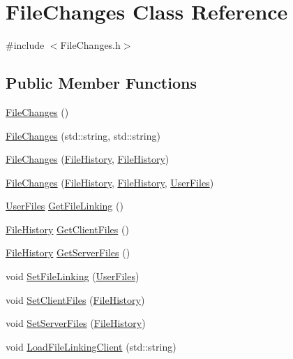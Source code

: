 \hypertarget{classFileChanges}{\section{File\-Changes Class Reference}
\label{classFileChanges}
}


{\ttfamily \#include $<$File\-Changes.\-h$>$}

\subsection*{Public Member Functions}
\begin{DoxyCompactItemize}
\item 
\hyperlink{classFileChanges_a08f26a2d98f89ead61b9ac168148c878}{File\-Changes} ()
\item 
\hyperlink{classFileChanges_aaca377114982dfcfa2b518baec9f5784}{File\-Changes} (std\-::string, std\-::string)
\item 
\hyperlink{classFileChanges_abdfc0f79e90aa8ad37267f98104d0933}{File\-Changes} (\hyperlink{classFileHistory}{File\-History}, \hyperlink{classFileHistory}{File\-History})
\item 
\hyperlink{classFileChanges_add57e12ef22e156189a30afd8e06eec9}{File\-Changes} (\hyperlink{classFileHistory}{File\-History}, \hyperlink{classFileHistory}{File\-History}, \hyperlink{classUserFiles}{User\-Files})
\item 
\hyperlink{classUserFiles}{User\-Files} \hyperlink{classFileChanges_a227a56abb0a1af33d58833f697ee0741}{Get\-File\-Linking} ()
\item 
\hyperlink{classFileHistory}{File\-History} \hyperlink{classFileChanges_a05a284928ea81e68f804a12138318248}{Get\-Client\-Files} ()
\item 
\hyperlink{classFileHistory}{File\-History} \hyperlink{classFileChanges_a70980beabde9fc4caf69db9be0bffdd0}{Get\-Server\-Files} ()
\item 
void \hyperlink{classFileChanges_a6331b8c6a9104c2539c568151bbed49e}{Set\-File\-Linking} (\hyperlink{classUserFiles}{User\-Files})
\item 
void \hyperlink{classFileChanges_a754475fca01cb7ca876e0abc955714be}{Set\-Client\-Files} (\hyperlink{classFileHistory}{File\-History})
\item 
void \hyperlink{classFileChanges_ac25be09314d3cd6dbf63d3ecf85524a2}{Set\-Server\-Files} (\hyperlink{classFileHistory}{File\-History})
\item 
void \hyperlink{classFileChanges_a689b1d4f9b4393e3fb41e78abe829dff}{Load\-File\-Linking\-Client} (std\-::string)

\end{DoxyCompactItemize}

